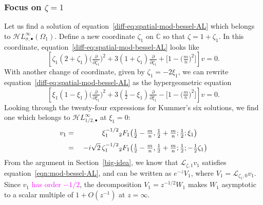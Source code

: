 \documentclass{article}
\newcommand{\singexp}[2]{\mathcal{H}L^\infty_{#1, #2}}
\newcommand{\singexpalg}[1]{\singexp{#1}{\bullet}}
\newcommand{\C}{\mathbb{C}}
\newcommand{\laplace}{\mathcal{L}}
\theoremstyle{definition}
\theoremstyle{plain}
\begin{document}
\subsubsection{Focus on $\zeta = 1$}\label{pos-root-AL}
Let us find a solution of equation~\eqref{diff-eq:spatial-mod-bessel-AL} which belongs to $\singexpalg{\sigma}(\Omega_1)$. Define a new coordinate $\zeta_1$ on $\C$ so that $\zeta = 1 + \zeta_1$. In this coordinate, equation~\eqref{diff-eq:spatial-mod-bessel-AL} looks like
\begin{equation}\label{diff-eq:spatial-mod-bessel-pos-AL}
\left[\zeta_1(2 + \zeta_1) \big(\tfrac{\partial}{\partial \zeta_1}\big)^2 + 3(1 + \zeta_1) \tfrac{\partial}{\partial \zeta_1} + \big[1 - \big(\tfrac{m}{n}\big)^2\big]\right] v = 0.
\end{equation}
With another change of coordinate, given by $\zeta_1 = -2\xi_1$, we can rewrite equation~\eqref{diff-eq:spatial-mod-bessel-AL} as the hypergeometric equation
\begin{equation}\label{diff-eq:hypergeom-pos-AL}
\left[\xi_1 (1 - \xi_1) \big(\tfrac{\partial}{\partial \xi_1}\big)^2 + 3(\tfrac{1}{2} - \xi_1) \tfrac{\partial}{\partial \xi_1} - \big[1 - \big(\tfrac{m}{n}\big)^2\big]\right] v = 0.
\end{equation}
Looking through the twenty-four expressions for Kummer's six solutions, we find one \cite[formula~15.10.12]{dlmf} which belongs to $\singexpalg{1/2}$ at $\xi_1 = 0$:
\begin{alignat*}{2}
v_1 &=\;& \hphantom{-i\sqrt{2}}\,\xi_1^{-1/2} & {}_2F_1\big(\tfrac{1}{2}-\tfrac{m}{n}, \tfrac{1}{2}+\tfrac{m}{n}; \tfrac{1}{2}; \xi_1\big) \\[1mm]
&=\;& -i\sqrt{2}\,\zeta_1^{-1/2} & {}_2F_1\big(\tfrac{1}{2}-\tfrac{m}{n}, \tfrac{1}{2}+\tfrac{m}{n}; \tfrac{1}{2}; -\tfrac{1}{2}\zeta_1\big)
\end{alignat*}
From the argument in Section~\ref{big-idea}, we know that $\laplace_{\zeta, 1} v_1$ satisfies equation~\eqref{eqn:mod-bessel-AL}, and can be written as $e^{-z} V_1$, where $V_1 = \laplace_{\zeta_1, 0} v_1$. Since $v_1$ \textcolor{magenta}{has order $-1/2$}, the decomposition $V_1 = z^{-1/2} W_1$ makes $W_1$ asymptotic to a scalar multiple of $1+O(z^{-1})$ at $z = \infty$.
\end{document}
